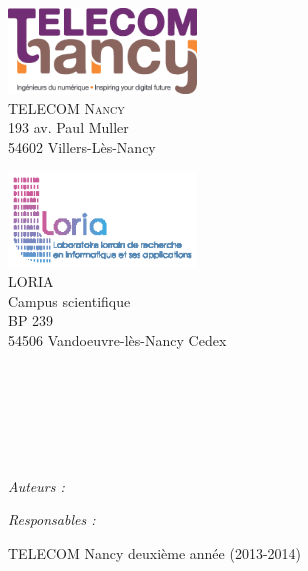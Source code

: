 \begin{titlepage}
$ $\\$ $\\$ $\\$ $\\
\begin{center}

\begin{minipage}[t]{0.48\textwidth}
  \begin{flushleft}
    \includegraphics [width=50mm]{images/TN.eps} \\[0.5cm]
      \textsc{\LARGE TELECOM Nancy \\}{\small 193 av. Paul Muller\\54602 Villers-Lès-Nancy}
  \end{flushleft}
\end{minipage}
\begin{minipage}[t]{0.48\textwidth}
  \begin{flushright}
    \includegraphics [width=50mm]{images/loria.eps} \\[0.5cm]
    \textsc{\LARGE LORIA\\}{\small Campus scientifique\\BP 239\\54506 Vandoeuvre-lès-Nancy Cedex}
  \end{flushright}
\end{minipage} \\[1.5cm]

\textsc{\Large \reportsubject}\\[0.5cm]
\HRule \\[0.7cm]
{\Huge \bfseries \reporttitle}\\[0.4cm]
\HRule \\[1.5cm]

\begin{minipage}[t]{0.3\textwidth}
  \begin{flushleft} \large
    \emph{Auteurs :}\\
    \reportauthor
  \end{flushleft}
\end{minipage}
\begin{minipage}[t]{0.6\textwidth}
  \begin{flushright} \large
    \emph{Responsables :} \\
    \reportresponsables
  \end{flushright}
\end{minipage}

\vfill

{\large TELECOM Nancy deuxième année (2013-2014)}

\end{center}

\end{titlepage}

